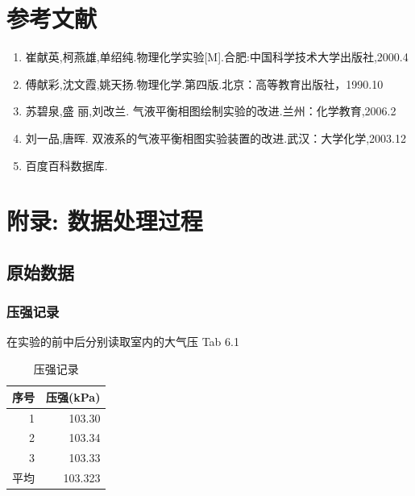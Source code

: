 \documentclass[11pt]{report}
\begin{document}
\part{参考文献}
\label{sec:org23b2405}
\begin{enumerate}
\item 崔献英,柯燕雄,单绍纯.物理化学实验[M].合肥:中国科学技术大学出版社,2000.4
\item 傅献彩,沈文霞,姚天扬.物理化学.第四版.北京：高等教育出版社，1990.10
\item 苏碧泉,盛 丽,刘改兰. 气液平衡相图绘制实验的改进.兰州：化学教育,2006.2
\item 刘一品,唐晖. 双液系的气液平衡相图实验装置的改进.武汉：大学化学,2003.12
\item 百度百科数据库.
\end{enumerate}

\part{附录: 数据处理过程}
\label{sec:org80f072a}
\chapter{原始数据}
\label{sec:orge83c704}
\section{压强记录}
\label{sec:orgbdc6681}
在实验的前中后分别读取室内的大气压 Tab 6.1
\begin{table}[htbp]
\caption{\label{tab:org75fc2af}压强记录}
\centering
\begin{tabular}{rr}
序号 & 压强(kPa)\\
\hline
1 & 103.30\\
2 & 103.34\\
3 & 103.33\\
\hline
平均 & 103.323\\
\end{tabular}
\end{table}
\end{document}
